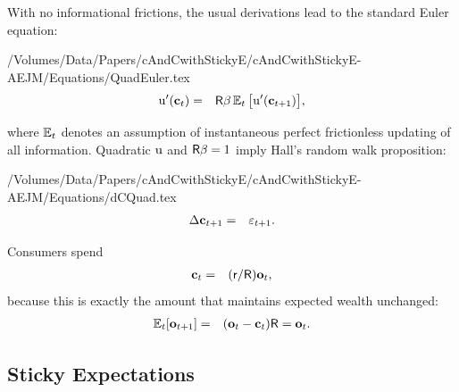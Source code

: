 With no informational frictions, the usual derivations lead to the standard Euler equation:
\begin{verbatimwrite}{/Volumes/Data/Papers/cAndCwithStickyE/cAndCwithStickyE-AEJM/Equations/QuadEuler.tex}
\begin{eqnarray*}
  {\mathrm{u}}^{\prime}(\mathbf{c}_{t}) & = & \mathsf{R}\beta \operatorname{\mathbb{E}}_{t}\big[{\mathrm{u}}^{\prime}(\mathbf{c}_{t+1})\big], \label{eq:QuadEuler}
\end{eqnarray*}
\end{verbatimwrite}

where $\operatorname{\mathbb{E}}_{t}$ denotes an assumption of instantaneous perfect frictionless updating of all information. Quadratic ${\mathrm{u}}$ and $\mathsf{R} \beta=1$ imply Hall's random walk proposition:
\begin{verbatimwrite}{/Volumes/Data/Papers/cAndCwithStickyE/cAndCwithStickyE-AEJM/Equations/dCQuad.tex}
\begin{eqnarray*}
  \Delta \mathbf{c}_{t+1} & = & \varepsilon_{t+1} \label{eq:dCQuad}.
\end{eqnarray*}
\end{verbatimwrite}

Consumers spend
\begin{eqnarray*}
  \mathbf{c}_{t} & = & (\mathsf{r}/\mathsf{R}) \mathbf{o}_{t}, \label{eq:cquad}
\end{eqnarray*}
because this is exactly the amount that maintains expected wealth unchanged:
\begin{eqnarray*}
  \operatorname{\mathbb{E}}_{t}[\mathbf{o}_{t+1}] & = & (\mathbf{o}_{t}-\mathbf{c}_{t})\mathsf{R} = \mathbf{o}_{t}
.
\end{eqnarray*}


\subsection{Sticky Expectations}

